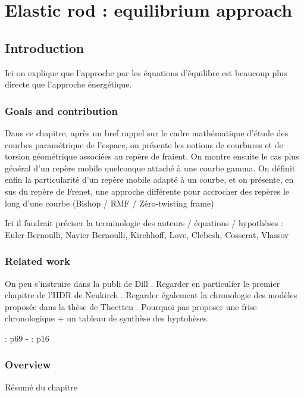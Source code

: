 \chapter{Elastic rod : equilibrium approach}

\section{Introduction}
Ici on explique que l'approche par les équations d'équilibre est beaucoup plus directe que l'approche énergétique.

\subsection{Goals and contribution}
Dans ce chapitre, après un bref rappel sur le cadre mathématique d'étude des courbes paramétrique de l'espace, on présente les notions de courbures et de torsion géométrique associées au repère de fraient. On montre ensuite le cas plus général d'un repère mobile quelconque attaché à une courbe gamma. On définit enfin la particularité d'un repère mobile adapté à un courbe, et on présente, en sus du repère de Frenet, une approche différente pour accrocher des repères le long d'une courbe (Bishop / RMF / Zéro-twisting frame)

Ici il faudrait préciser la terminologie des auteurs / équations / hypothèses :
Euler-Bernoulli, Navier-Bernoulli, Kirchhoff, Love, Clebesh, Cosserat, Vlassov

\subsection{Related work}
On peu s'instruire dans la publi de Dill \cite{Dill1992}.
Regarder en particulier le premier chapitre de l'HDR de Neukirch \cite{Neukirch2009}.
Regarder également la chronologie des modèles proposée dans la thèse de Theetten \cite{Theetten2007}.
Pourquoi pas proposer une frise chronologique + un tableau de synthèse des hyptohèses.

\cite{Dill1992}
\citet{Neukirch2009}
\cite{Adriaenssens1999}
\cite{Hoogenboom2006}
\cite{Lang2009}
\cite{Spillmann2008}
\cite{Antman2005}

\cite{Neukirch2009} : p69 - \cite{Dill1992} : p16

\subsection{Overview}
Résumé du chapitre


